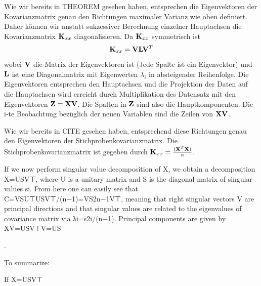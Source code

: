 Wie wir bereits in THEOREM gesehen haben, entsprechen die Eigenvektoren der Kovarianzmatrix genau den Richtungen maximaler Varianz wie oben definiert. Daher können wir anstatt sukzessiver Berechnung einzelner Hauptachsen die Kovarianzmatrix $\mathbf{K}_{xx}$ diagonalisieren. Da $\mathbf{K}_{xx}$ symmetrisch ist
$$\mathbf{K}_{xx} = \mathbf{V} \mathbf{L} \mathbf{V}^T$$
wobei $\mathbf{V}$ die Matrix der Eigenvektoren ist (Jede Spalte ist ein Eigenvektor) und $\mathbf{L}$ ist eine Diagonalmatrix mit Eigenwerten $\lambda_i$ in absteigender Reihenfolge. Die Eigenvektoren entsprechen den Hauptachsen und die Projektion der Daten auf die Hauptachsen wird erreicht durch Multiplikation des Datensatz mit den Eigenvektoren $\mathbf{Z} = \mathbf{X} \mathbf{V}$. Die Spalten in $\mathbf{Z}$ sind also die Hauptkomponenten. Die i-te Beobachtung bezüglich der neuen Variablen sind die Zeilen von $\mathbf{X}\mathbf{V}$.



 Wie wir bereits in CITE gesehen haben, entsprechend diese Richtungen genau den Eigenvektoren der Stichprobenkovarianzmatrix. Die Stichprobenkovarianzmatrix ist gegeben durch $\mathbf{K}_{xx} = \frac{(\mathbf{X}^T\mathbf{X})}{n}$. 
 
 If we now perform singular value decomposition of X, we obtain a decomposition
X=USV⊤,
where U is a unitary matrix and S is the diagonal matrix of singular values si. From here one can easily see that
C=VSU⊤USV⊤/(n−1)=VS2n−1V⊤,
meaning that right singular vectors V are principal directions and that singular values are related to the eigenvalues of covariance matrix via λi=s2i/(n−1). Principal components are given by XV=USV⊤V=US

.

To summarize:

    If X=USV⊤

